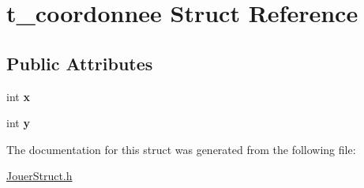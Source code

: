 \hypertarget{structt__coordonnee}{}\section{t\+\_\+coordonnee Struct Reference}
\label{structt__coordonnee}
\subsection*{Public Attributes}
\begin{DoxyCompactItemize}
\item 
\hypertarget{structt__coordonnee_adc43d2ee9bc8331939123bf7f019a5f6}{}int {\bfseries x}\label{structt__coordonnee_adc43d2ee9bc8331939123bf7f019a5f6}

\item 
\hypertarget{structt__coordonnee_a59976d5ac64eac95bdbe12b4453f1af3}{}int {\bfseries y}\label{structt__coordonnee_a59976d5ac64eac95bdbe12b4453f1af3}

\end{DoxyCompactItemize}


The documentation for this struct was generated from the following file\+:\begin{DoxyCompactItemize}
\item 
\hyperlink{_jouer_struct_8h}{Jouer\+Struct.\+h}\end{DoxyCompactItemize}
